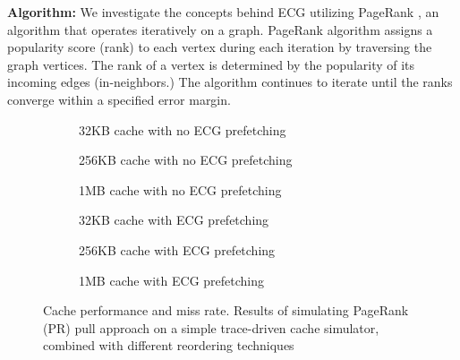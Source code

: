 \documentclass[conference]{IEEEtran}
\begin{document}

\textbf{Algorithm:} We investigate the concepts behind ECG utilizing PageRank \cite{page_pagerank_1999,brin_anatomy_1998,bianchini_inside_2005,beamer_gap_2017}, an algorithm that operates iteratively on a graph. PageRank algorithm assigns a popularity score (rank) to each vertex during each iteration by traversing the graph vertices. The rank of a vertex is determined by the popularity of its incoming edges (in-neighbors.) The algorithm continues to iterate until the ranks converge within a specified error margin.
\begin{figure}[t]
\centering
\begin{subfigure}{.32\linewidth}
\caption{32KB cache with no ECG prefetching}

\label{fig:cache:fig1}
\end{subfigure}
\begin{subfigure}{.32\linewidth}
\caption{256KB cache with no ECG prefetching}

\label{fig:cache:fig2}
\end{subfigure}
\begin{subfigure}{.32\linewidth}
\caption{1MB cache with no ECG prefetching}

\label{fig:cache:fig3}
\end{subfigure}

\begin{subfigure}{.32\linewidth}
\caption{32KB cache with ECG prefetching}

\label{fig:cache:fig4}
\end{subfigure}
\begin{subfigure}{.32\linewidth}
\caption{256KB cache with ECG prefetching}

\label{fig:cache:fig5}
\end{subfigure}
\begin{subfigure}{.32\linewidth}
\caption{1MB cache with ECG prefetching}

\label{fig:cache:fig6}
\end{subfigure}

\caption{Cache performance and miss rate. Results of simulating PageRank (PR) pull approach on a simple trace-driven cache simulator, combined with different reordering techniques}
\label{fig:cache:performance}
\end{figure}
\end{document}
